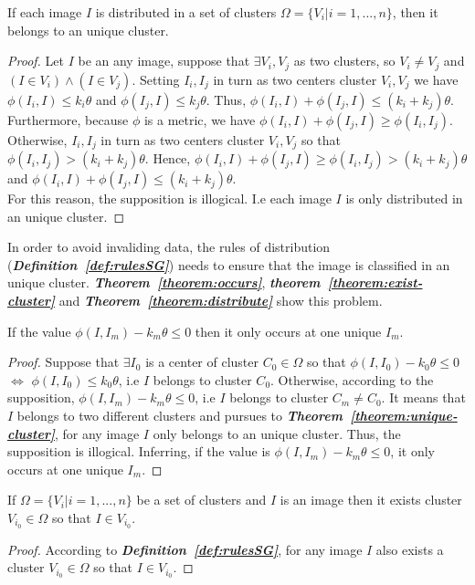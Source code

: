 \documentclass{amcs}
\begin{document}
\begin{theorem}{}
If each image $I$ is distributed in a set of clusters $\Omega  = \{ {V_i}|i = 1,...,n\} $, then it belongs to an unique cluster.
\label{theorem:unique-cluster}
\end{theorem}
\begin{proof}{}
Let $I$ be an any image, suppose that $\exists {V_i},{V_j}$ as two clusters, so ${V_i} \ne {V_j}$ and $(I \in {V_i}) \wedge (I \in {V_j})$. Setting ${I_i},{I_j}$ in turn as two centers cluster ${V_i},{V_j}$ we have $\phi ({I_i},I) \le {k_i}\theta $ and $\phi ({I_j},I) \le {k_j}\theta $. Thus, $\phi ({I_i},I) + \phi ({I_j},I) \le ({k_i} + {k_j})\theta $. Furthermore, because $\phi $ is a metric, we have $\phi ({I_i},I) + \phi ({I_j},I) \ge \phi ({I_i},{I_j})$. Otherwise, ${I_i},{I_j}$ in turn as two centers cluster ${V_i},{V_j}$ so that $\phi ({I_i},{I_j}) > ({k_i} + {k_j})\theta $. Hence, $\phi ({I_i},I) + \phi ({I_j},I) \ge \phi ({I_i},{I_j}) > ({k_i} + {k_j})\theta $ and $\phi ({I_i},I) + \phi ({I_j},I) \le ({k_i} + {k_j})\theta $. 
\\For this reason, the supposition is illogical. I.e each image $I$ is only distributed in an unique cluster.
\end{proof}

In order to avoid invaliding data, the rules of distribution (\textit{\textbf{Definition~\ref{def:rulesSG}}}) needs to ensure that the image is classified in an unique cluster. \textit{\textbf{Theorem~\ref{theorem:occurs}}}, \textit{\textbf{theorem~\ref{theorem:exist-cluster}}} and \textit{\textbf{Theorem~\ref{theorem:distribute}}} show this problem.
\begin{theorem}{}
If the value $\phi (I,{I_m}) - {k_m}\theta  \le 0$ then it only occurs at one unique ${I_m}$.
\label{theorem:occurs}
\end{theorem}
\begin{proof}{}
Suppose that $\exists {I_0}$ is a center of cluster ${C_0} \in \Omega $ so that $\phi (I,{I_0}) - {k_0}\theta  \le 0$ $ \Leftrightarrow $ $\phi (I,{I_0}) \le {k_0}\theta $, i.e $I$ belongs to cluster ${C_0}$. Otherwise, according to the supposition, $\phi (I,{I_m}) - {k_m}\theta  \le 0$, i.e  $I$ belongs to cluster ${C_m} \ne {C_0}$. It means that $I$ belongs to two different clusters and pursues to \textit{\textbf{Theorem~\ref{theorem:unique-cluster}}}, for any image $I$ only belongs to an unique cluster. Thus, the supposition is illogical. Inferring, if the value is $\phi (I,{I_m}) - {k_m}\theta  \le 0$, it only occurs at one unique ${I_m}$.
\end{proof}
\begin{theorem}{}
If $\Omega  = \{ {V_i}|i = 1,...,n\} $ be a set of clusters and $I$ is an image then it exists cluster ${V_{{i_0}}} \in \Omega $ so that $I \in {V_{{i_0}}}$.
\label{theorem:exist-cluster}
\end{theorem}
\begin{proof}{}
According to \textit{\textbf{Definition~\ref{def:rulesSG}}}, for any image $I$ also exists a cluster ${V_{{i_0}}} \in \Omega $ so that $I \in {V_{{i_0}}}$.
\end{proof}
\end{document}
